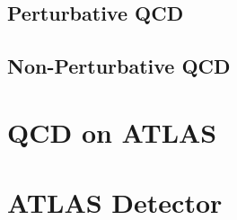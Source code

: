 \documentclass[a4paper,11pt]{report}
\begin{document}
\section{Perturbative QCD}

\section{Non-Perturbative QCD}


\chapter{QCD on ATLAS}

\chapter{ATLAS Detector}
\label{ch:intro}


\clearpage
\listoffigures
{}


\clearpage
\listoftables
{}



\clearpage


\end{document}
